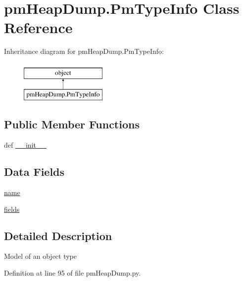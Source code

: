 \hypertarget{classpm_heap_dump_1_1_pm_type_info}{\section{pm\-Heap\-Dump.\-Pm\-Type\-Info Class Reference}
\label{classpm_heap_dump_1_1_pm_type_info}
}
Inheritance diagram for pm\-Heap\-Dump.\-Pm\-Type\-Info\-:\begin{figure}[H]
\begin{center}
\leavevmode
\includegraphics[height=2.000000cm]{classpm_heap_dump_1_1_pm_type_info}
\end{center}
\end{figure}
\subsection*{Public Member Functions}
\begin{DoxyCompactItemize}
\item 
def \hyperlink{classpm_heap_dump_1_1_pm_type_info_a6108e0448863cd6167d64103039b5c48}{\-\_\-\-\_\-init\-\_\-\-\_\-}
\end{DoxyCompactItemize}
\subsection*{Data Fields}
\begin{DoxyCompactItemize}
\item 
\hyperlink{classpm_heap_dump_1_1_pm_type_info_a9684a2b50d6c7dce84b6c9fb27a265b6}{name}
\item 
\hyperlink{classpm_heap_dump_1_1_pm_type_info_a0d8dbdc9ee3ced9013c3bf7b4d3a6f3c}{fields}
\end{DoxyCompactItemize}


\subsection{Detailed Description}
\begin{DoxyVerb}Model of an object type
\end{DoxyVerb}
 

Definition at line 95 of file pm\-Heap\-Dump.\-py.



